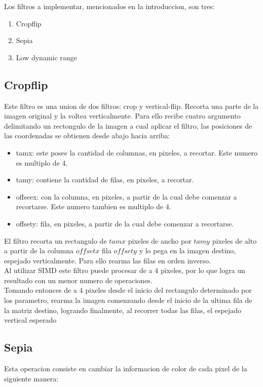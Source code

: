 Los filtros a implementar, mencionados en la introduccion, son tres:
 
\begin{enumerate}
\item Cropflip
\item Sepia
\item Low dynamic range 
\end{enumerate}
\subsection{Cropflip}
Este filtro es una union de dos filtros: crop y vertical-flip. Recorta una parte de la imagen original y la voltea verticalmente. Para ello recibe cuatro argumento delimitando un rectongulo de la imagen a cual aplicar el filtro, las posiciones de las coordenadas se obtienen desde abajo hacia arriba:
\begin{itemize}
\item{tamx: este posee la cantidad de columnas, en pixeles, a recortar. Este numero es multiplo de 4.}
\item{tamy: contiene la cantidad de filas, en pixeles, a recortar.}
\item{offseex: con la columna, en pixeles, a partir de la cual debe comenzar a recortarse. Este numero tambien es multiplo de 4.}
\item{offsety: fila, en pixeles, a partir de la cual debe comenzar a recortarse.}
\end{itemize}
 El filtro recorta un rectangulo de {\boldmath $ tamx $} pixeles de ancho por {\boldmath $ tamy $} pixeles de alto a partir de
la columna {\boldmath $ offsetx $} fila {\boldmath $ offsety $} y lo pega en la imagen destino, espejado verticalmente. Para ello rearma las filas en orden inverso.\\
Al utilizar SIMD este filtro puede procesar de a 4 pixeles, por lo que logra un resultado con un menor numero de operaciones.\\ 
 Tomando entonces de a 4 pixeles desde el inicio del rectangulo determinado por los parametro, rearma la imagen comenzando desde el inicio de la ultima fila de la matriz destino, logrando finalmente, al recorrer todas las filas, el espejado vertical esperado
\subsection{Sepia}
Esta operacion consiste en cambiar la informacion de color de cada pixel de la siguiente manera:

